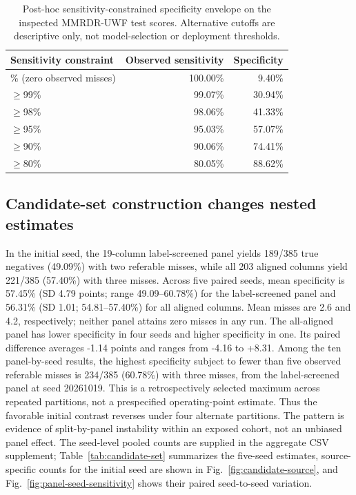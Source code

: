 \documentclass[11pt]{article}
\begin{document}
\begin{table}[t]
\centering
\caption{Post-hoc sensitivity-constrained specificity envelope on the inspected MMRDR-UWF test scores. Alternative cutoffs are descriptive only, not model-selection or deployment thresholds.}
\label{tab:mmrdr-test-frontier}
\small
\begin{tabularx}{\linewidth}{>{\raggedright\arraybackslash}Xrr}
\toprule
Sensitivity constraint & Observed sensitivity & Specificity \\
\midrule
100\% (zero observed misses) & 100.00\% & 9.40\% \\
$\geq$99\% & 99.07\% & 30.94\% \\
$\geq$98\% & 98.06\% & 41.33\% \\
$\geq$95\% & 95.03\% & 57.07\% \\
$\geq$90\% & 90.06\% & 74.41\% \\
$\geq$80\% & 80.05\% & 88.62\% \\
\bottomrule
\end{tabularx}
\end{table}

\subsection{Candidate-set construction changes nested estimates}
In the initial seed, the 19-column label-screened panel yields 189/385 true negatives (49.09\%) with two referable misses, while all 203 aligned columns yield 221/385 (57.40\%) with three misses. Across five paired seeds, mean specificity is 57.45\% (SD 4.79 points; range 49.09--60.78\%) for the label-screened panel and 56.31\% (SD 1.01; 54.81--57.40\%) for all aligned columns. Mean misses are 2.6 and 4.2, respectively; neither panel attains zero misses in any run. The all-aligned panel has lower specificity in four seeds and higher specificity in one. Its paired difference averages -1.14 points and ranges from -4.16 to +8.31. Among the ten panel-by-seed results, the highest specificity subject to fewer than five observed referable misses is 234/385 (60.78\%) with three misses, from the label-screened panel at seed 20261019. This is a retrospectively selected maximum across repeated partitions, not a prespecified operating-point estimate. Thus the favorable initial contrast reverses under four alternate partitions. The pattern is evidence of split-by-panel instability within an exposed cohort, not an unbiased panel effect. The seed-level pooled counts are supplied in the aggregate CSV supplement; Table~\ref{tab:candidate-set} summarizes the five-seed estimates, source-specific counts for the initial seed are shown in Fig.~\ref{fig:candidate-source}, and Fig.~\ref{fig:panel-seed-sensitivity} shows their paired seed-to-seed variation.
\end{document}
